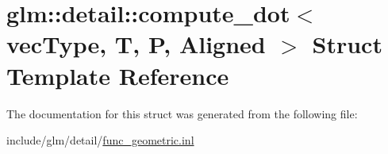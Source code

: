 \hypertarget{structglm_1_1detail_1_1compute__dot}{}\section{glm\+:\+:detail\+:\+:compute\+\_\+dot$<$ vec\+Type, T, P, Aligned $>$ Struct Template Reference}
\label{structglm_1_1detail_1_1compute__dot}


The documentation for this struct was generated from the following file\+:\begin{DoxyCompactItemize}
\item 
include/glm/detail/\hyperlink{func__geometric_8inl}{func\+\_\+geometric.\+inl}\end{DoxyCompactItemize}
